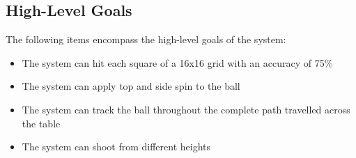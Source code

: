 \documentclass[11pt]{article}
\begin{document}
\subsection{High-Level Goals}
The following items encompass the high-level goals of the system:
\begin{itemize}
\item The system can hit each square of a 16x16 grid with an accuracy of 75\%
\item The system can apply top and side spin to the ball
\item The system can track the ball throughout the complete path travelled across the table
\item The system can shoot from different heights
\end{itemize}
\end{document}
